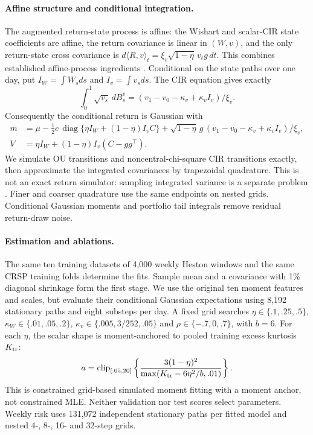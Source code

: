 \documentclass[11pt]{article}
\theoremstyle{definition}\newtheorem{definition}[theorem]{Definition}
\theoremstyle{remark}\newtheorem{remark}[theorem]{Remark}
\begin{document}
\paragraph{Affine structure and conditional integration.}
The augmented return-state process is affine: the Wishart and scalar-CIR state coefficients are affine, the return covariance is linear in $(W,v)$, and the only return-state cross covariance is $d\langle R,v\rangle_t=\xi_v\sqrt{1-\eta}\,v_t g\,dt$. This combines established affine-process ingredients \citep{cuchiero2011affine}. Conditional on the state paths over one day, put $I_W=\int W_sds$ and $I_v=\int v_sds$. The CIR equation gives exactly
\[
 \int_0^1\sqrt{v_s}\,dB_s^v=(v_1-v_0-\kappa_v+\kappa_v I_v)/\xi_v.
\]
Consequently the conditional return is Gaussian with
\begin{align*}
 m&=\mu-\tfrac12 c\,\operatorname{diag}\{\eta I_W+(1-\eta)I_vC\}
 +\sqrt{1-\eta}\,g\,(v_1-v_0-\kappa_v+\kappa_v I_v)/\xi_v,\\
 V&=\eta I_W+(1-\eta)I_v(C-gg^\top).
\end{align*}
We simulate OU transitions and noncentral-chi-square CIR transitions exactly, then approximate the integrated covariances by trapezoidal quadrature. This is not an exact return simulator: sampling integrated variance is a separate problem \citep{broadie2006exact}. Finer and coarser quadrature use the same endpoints on nested grids. Conditional Gaussian moments and portfolio tail integrals remove residual return-draw noise.

\paragraph{Estimation and ablations.}
The same ten training datasets of 4,000 weekly Heston windows and the same CRSP training folds determine the fits. Sample mean and a covariance with 1\% diagonal shrinkage form the first stage. We use the original ten moment features and scales, but evaluate their conditional Gaussian expectations using 8,192 stationary paths and eight substeps per day. A fixed grid searches $\eta\in\{.1,.25,.5\}$, $\kappa_W\in\{.01,.05,.2\}$, $\kappa_v\in\{.005,3/252,.05\}$ and $\rho\in\{-.7,0,.7\}$, with $b=6$. For each $\eta$, the scalar shape is moment-anchored to pooled training excess kurtosis $K_{\rm tr}$:
\[
 a=\operatorname{clip}_{[.05,20]}
 \left\{\frac{3(1-\eta)^2}{\max(K_{\rm tr}-6\eta^2/b,.01)}\right\}.
\]
This is constrained grid-based simulated moment fitting with a moment anchor, not constrained MLE. Neither validation nor test scores select parameters. Weekly risk uses 131,072 independent stationary paths per fitted model and nested 4-, 8-, 16- and 32-step grids.
\end{document}
